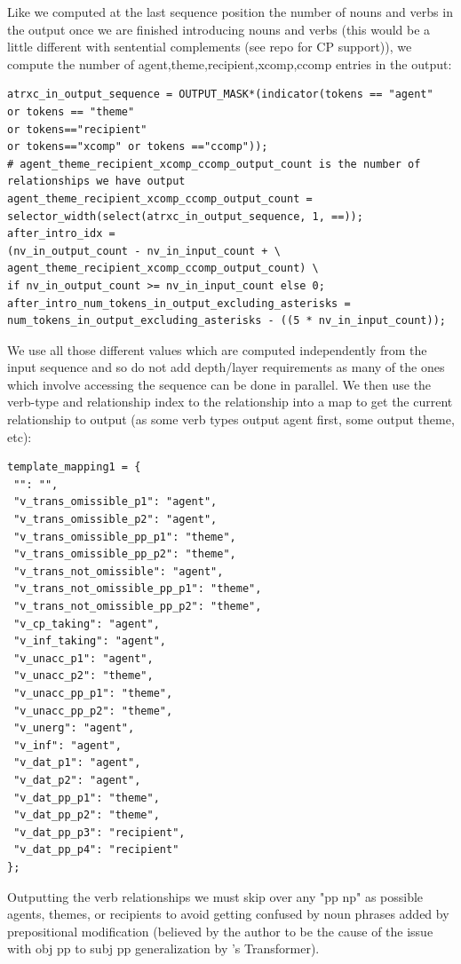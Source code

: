 \documentclass[11pt]{article}
\begin{document}
Like we computed at the last sequence position the number of nouns and verbs in the output once we are finished introducing nouns and verbs (this would be a little different with sentential complements (see repo for CP support)), we compute the number of agent,theme,recipient,xcomp,ccomp entries in the output:
\begin{tiny}
\begin{verbatim}
atrxc_in_output_sequence = OUTPUT_MASK*(indicator(tokens == "agent" 
or tokens == "theme" 
or tokens=="recipient" 
or tokens=="xcomp" or tokens =="ccomp"));
# agent_theme_recipient_xcomp_ccomp_output_count is the number of relationships we have output
agent_theme_recipient_xcomp_ccomp_output_count = 
selector_width(select(atrxc_in_output_sequence, 1, ==));
after_intro_idx = 
(nv_in_output_count - nv_in_input_count + \
agent_theme_recipient_xcomp_ccomp_output_count) \
if nv_in_output_count >= nv_in_input_count else 0;
after_intro_num_tokens_in_output_excluding_asterisks = 
num_tokens_in_output_excluding_asterisks - ((5 * nv_in_input_count));
\end{verbatim}
\end{tiny}
\clearpage
We use all those different values which are computed independently from the input sequence and so do not add depth/layer requirements as many of the ones which involve accessing the sequence can be done in parallel. 
We then use the verb-type and relationship index to the relationship into a map to get the current relationship to output (as some verb types output agent first, some output theme, etc):
\begin{tiny}
\begin{verbatim}
template_mapping1 = {
 "": "",
 "v_trans_omissible_p1": "agent",
 "v_trans_omissible_p2": "agent",
 "v_trans_omissible_pp_p1": "theme",
 "v_trans_omissible_pp_p2": "theme",
 "v_trans_not_omissible": "agent",
 "v_trans_not_omissible_pp_p1": "theme",
 "v_trans_not_omissible_pp_p2": "theme",
 "v_cp_taking": "agent",
 "v_inf_taking": "agent",
 "v_unacc_p1": "agent",
 "v_unacc_p2": "theme",
 "v_unacc_pp_p1": "theme",
 "v_unacc_pp_p2": "theme",
 "v_unerg": "agent",
 "v_inf": "agent",
 "v_dat_p1": "agent",
 "v_dat_p2": "agent",
 "v_dat_pp_p1": "theme",
 "v_dat_pp_p2": "theme",
 "v_dat_pp_p3": "recipient",
 "v_dat_pp_p4": "recipient"
};
\end{verbatim}
\end{tiny}

Outputting the verb relationships we must skip over any "pp np" as possible agents, themes, or recipients to avoid getting confused by noun phrases added by prepositional modification (believed by the author to be the cause of the issue with obj pp to subj pp generalization by \cite{Wu2023}'s Transformer).
\end{document}
